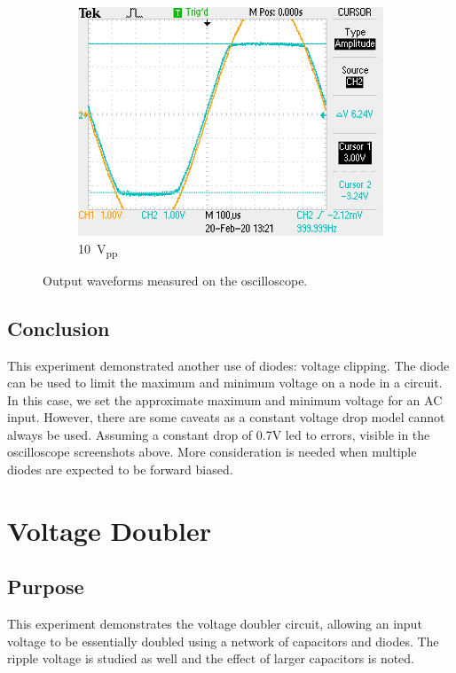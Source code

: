 \documentclass{report}
\newcommand{\pp}{_{pp}}
\newcommand{\Vpp}{\V\pp}
\begin{document}
\begin{figure}[h]
\begin{subfigure}{0.3\textwidth}
		\includegraphics[width=\linewidth]{exp4_c}
		\caption{\SI{10}{\Vpp}}
		\label{fig:exp4c}
	\end{subfigure}

	\caption{Output waveforms measured on the oscilloscope.}
\end{figure}
\subsection{Conclusion}
This experiment demonstrated another use of diodes: voltage clipping. The diode can be used to limit the maximum and minimum voltage on a node in a circuit. In this case, we set the approximate maximum and minimum voltage for an AC input. However, there are some caveats as a constant voltage drop model cannot always be used. Assuming a constant drop of 0.7V led to errors, visible in the oscilloscope screenshots above. More consideration is needed when multiple diodes are expected to be forward biased.

\section{Voltage Doubler}

\subsection{Purpose}
This experiment demonstrates the voltage doubler circuit, allowing an input voltage to be essentially doubled using a network of capacitors and diodes. The ripple voltage is studied as well and the effect of larger capacitors is noted.
\end{document}
